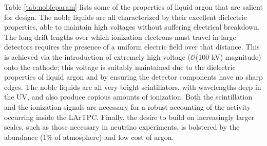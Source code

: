 Table \ref{tab:nobleparam} lists some of the properties of liquid argon that are salient for \lartpc design.  The noble liquids are all characterized by their excellent dielectric properties, able to maintain high voltages without suffering electrical breakdown.  The long drift lengths over which ionization electrons must travel in large \lartpc detectors requires the presence of a uniform electric field over that distance.  This is achieved via the introduction of extremely high voltage ($\mathcal{O}$(100 kV) magnitude) onto the \lartpc cathode; this voltage is suitably maintained due to the dielectric properties of liquid argon and by ensuring the detector components have no sharp edges.  The noble liquids are all very bright scintillators, with wavelengths deep in the UV, and also produce copious amounts of ionization.  Both the scintillation and the ionization signals are necessary for a robust accounting of the activity occurring inside the LArTPC.  Finally, the desire to build \lartpcs on increasingly larger scales, such as those necessary in neutrino experiments, is bolstered by the abundance (1$\%$ of atmosphere) and low cost of argon.


